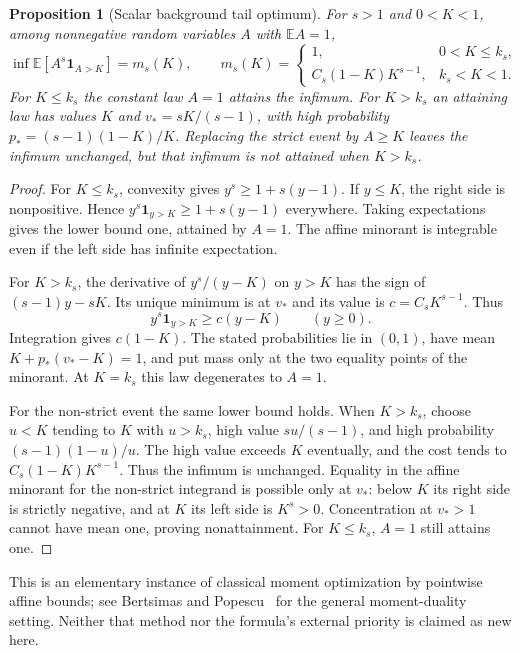 \documentclass[11pt]{article}
\newtheorem{proposition}[theorem]{Proposition}
\begin{document}
\begin{proposition}[Scalar background tail optimum]\label{prop:background-optimum}
For $s>1$ and $0<K<1$, among nonnegative random variables $A$ with
$\mathbb E A=1$,
\[
 \inf\mathbb E[A^s\mathbf1_{A>K}]=m_s(K),\qquad
 m_s(K)=\begin{cases}
 1,&0<K\le k_s,\\
 C_s(1-K)K^{s-1},&k_s<K<1.
 \end{cases}
\]
For $K\le k_s$ the constant law $A=1$ attains the infimum. For $K>k_s$
an attaining law has values $K$ and $v_*=sK/(s-1)$, with high probability
$p_*=(s-1)(1-K)/K$. Replacing the strict event by $A\ge K$ leaves
the infimum unchanged, but that infimum is not attained when $K>k_s$.
\end{proposition}
\begin{proof}
For $K\le k_s$, convexity gives $y^s\ge1+s(y-1)$. If $y\le K$, the
right side is nonpositive. Hence $y^s\mathbf1_{y>K}\ge1+s(y-1)$
everywhere. Taking expectations gives the lower bound one, attained
by $A=1$. The affine minorant is integrable even if the left side has
infinite expectation.

For $K>k_s$, the derivative of $y^s/(y-K)$ on $y>K$ has the sign
of $(s-1)y-sK$. Its unique minimum is at $v_*$ and its value is
$c=C_sK^{s-1}$. Thus
\[
 y^s\mathbf1_{y>K}\ge c(y-K)\qquad(y\ge0).
\]
Integration gives $c(1-K)$. The stated probabilities lie in $(0,1)$,
have mean $K+p_*(v_*-K)=1$, and put mass only at the two equality
points of the minorant. At $K=k_s$ this law degenerates to $A=1$.

For the non-strict event the same lower bound holds. When $K>k_s$,
choose $u<K$ tending to $K$ with $u>k_s$, high value $su/(s-1)$,
and high probability $(s-1)(1-u)/u$. The high value exceeds $K$
eventually, and the cost tends to $C_s(1-K)K^{s-1}$. Thus the
infimum is unchanged. Equality in the affine minorant for the
non-strict integrand is possible only at $v_*$: below $K$ its
right side is strictly negative, and at $K$ its left side is $K^s>0$.
Concentration at $v_*>1$ cannot have mean one, proving nonattainment.
For $K\le k_s$, $A=1$ still attains one.
\end{proof}

This is an elementary instance of classical moment optimization by
pointwise affine bounds; see Bertsimas and Popescu~\cite{BertsimasPopescu}
for the general moment-duality setting. Neither that method nor the
formula's external priority is claimed as new here.
\end{document}
